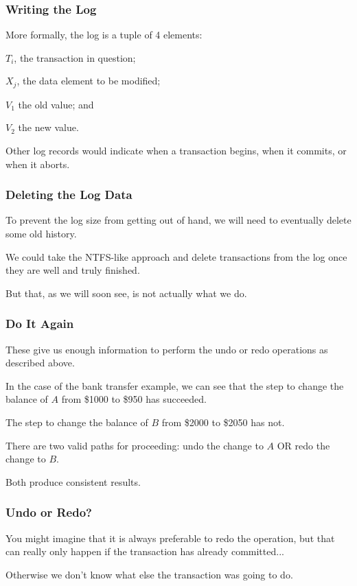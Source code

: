 \begin{frame}
\frametitle{Writing the Log}
More formally, the log is a tuple of 4 elements: 

$T_{i}$, the transaction in question; 

$X_{j}$, the data element to be modified; 

$V_{1}$ the old value; and 

$V_{2}$ the new value. 

Other log records would indicate when a transaction begins, when it commits, or when it aborts. 

\end{frame}

\begin{frame}
\frametitle{Deleting the Log Data}

To prevent the log size from getting out of hand, we will need to eventually delete some old history. 

We could take the NTFS-like approach and delete transactions from the log once they are well and truly finished. 

But that, as we will soon see, is not actually what we do. 

\end{frame}

\begin{frame}
\frametitle{Do It Again}

These give us enough information to perform the undo or redo operations as described above. 

In the case of the bank transfer example, we can see that the step to change the balance of $A$ from \$1000 to \$950 has succeeded. 

The step to change the balance of $B$ from \$2000 to \$2050 has not. 

There are two valid paths for proceeding: undo the change to $A$ OR redo the change to $B$. 

Both produce consistent results.


\end{frame}


\begin{frame}
\frametitle{Undo or Redo?}

You might imagine that it is always preferable to redo the operation, but that can really only happen if the transaction has already committed... 

Otherwise we don't know what else the transaction was going to do.


\end{frame}



